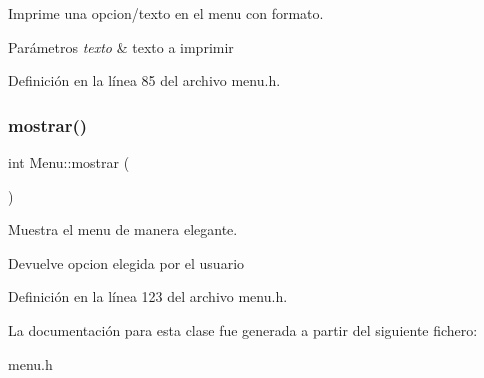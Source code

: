 Imprime una opcion/texto en el menu con formato. 


\begin{DoxyParams}{Parámetros}
{\em texto} & texto a imprimir \\
\hline
\end{DoxyParams}


Definición en la línea 85 del archivo menu.\+h.

\mbox{\label{classMenu_a909877f977f662803994c67e862b4b87}} 
\subsubsection{\texorpdfstring{mostrar()}{mostrar()}}
{\footnotesize\ttfamily int Menu\+::mostrar (\begin{DoxyParamCaption}{ }\end{DoxyParamCaption})\hspace{0.3cm}{\ttfamily [inline]}}



Muestra el menu de manera elegante. 

\begin{DoxyReturn}{Devuelve}
opcion elegida por el usuario 
\end{DoxyReturn}


Definición en la línea 123 del archivo menu.\+h.



La documentación para esta clase fue generada a partir del siguiente fichero\+:\begin{DoxyCompactItemize}
\item 
menu.\+h\end{DoxyCompactItemize}
